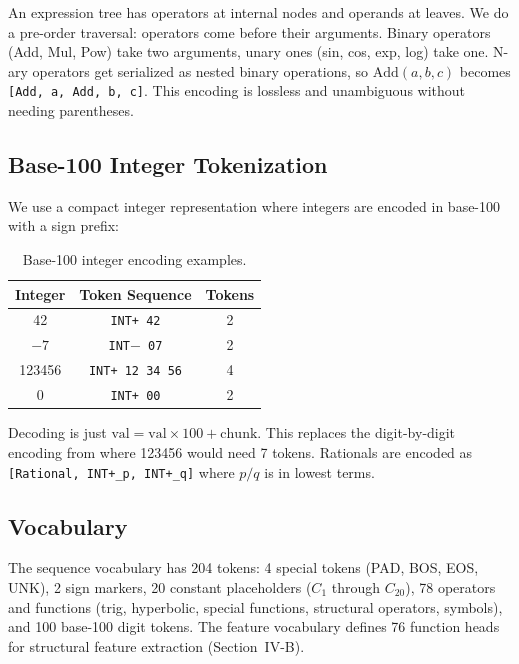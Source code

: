 \documentclass[conference]{IEEEtran}
\begin{document}
An expression tree has operators at internal nodes and operands at leaves. We do a pre-order traversal: operators come before their arguments. Binary operators (Add, Mul, Pow) take two arguments, unary ones (sin, cos, exp, log) take one. N-ary operators get serialized as nested binary operations, so $\text{Add}(a, b, c)$ becomes \texttt{[Add, a, Add, b, c]}. This encoding is lossless and unambiguous without needing parentheses.

\subsection{Base-100 Integer Tokenization}

We use a compact integer representation where integers are encoded in base-100 with a sign prefix:

\begin{table}[htbp]
\caption{Base-100 integer encoding examples.}
\begin{center}
\begin{tabular}{|c|c|c|}
\hline
\textbf{Integer} & \textbf{Token Sequence} & \textbf{Tokens} \\
\hline
42 & \texttt{INT+ 42} & 2 \\
\hline
$-7$ & \texttt{INT$-$ 07} & 2 \\
\hline
123456 & \texttt{INT+ 12 34 56} & 4 \\
\hline
0 & \texttt{INT+ 00} & 2 \\
\hline
\end{tabular}
\label{tab:encoding}
\end{center}
\end{table}

Decoding is just $\text{val} = \text{val} \times 100 + \text{chunk}$. This replaces the digit-by-digit encoding from \cite{b19} where 123456 would need 7 tokens. Rationals are encoded as \texttt{[Rational, INT+\_p, INT+\_q]} where $p/q$ is in lowest terms.

\subsection{Vocabulary}

The sequence vocabulary has 204 tokens: 4 special tokens (PAD, BOS, EOS, UNK), 2 sign markers, 20 constant placeholders ($C_1$ through $C_{20}$), 78 operators and functions (trig, hyperbolic, special functions, structural operators, symbols), and 100 base-100 digit tokens. The feature vocabulary defines 76 function heads for structural feature extraction (Section~IV-B).
\end{document}
